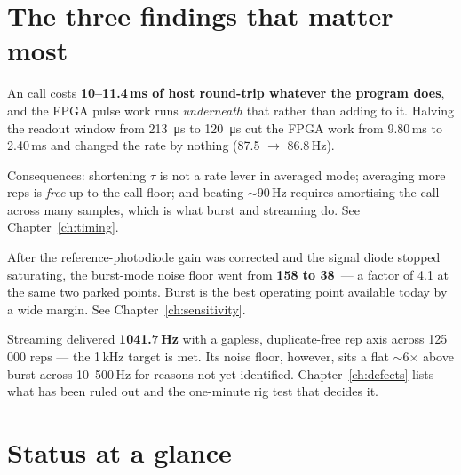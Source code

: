 \section{The three findings that matter most}

\begin{keybox}
An  call costs \textbf{10--11.4\,ms of host round-trip whatever the
program does}, and the FPGA pulse work runs \emph{underneath} that rather than
adding to it. Halving the readout window from \SI{213}{\micro\second} to
\SI{120}{\micro\second} cut the FPGA work from 9.80\,ms to 2.40\,ms and changed
the rate by nothing (87.5 $\rightarrow$ 86.8\,Hz).

Consequences: shortening $\tau$ is not a rate lever in averaged mode; averaging
more reps is \emph{free} up to the call floor; and beating $\sim$90\,Hz requires
amortising the call across many samples, which is what burst and streaming do.
See Chapter~\ref{ch:timing}.
\end{keybox}

\begin{keybox}
After the reference-photodiode gain was corrected and the signal diode stopped
saturating, the burst-mode noise floor went from \textbf{158 to 38\,\etaunit} ---
a factor of 4.1 at the same two parked points. Burst is the best operating point
available today by a wide margin. See Chapter~\ref{ch:sensitivity}.
\end{keybox}

\begin{keybox}
Streaming delivered \textbf{1041.7\,Hz} with a gapless, duplicate-free rep axis
across 125\,000 reps --- the 1\,kHz target is met. Its noise floor, however, sits
a flat $\sim$6$\times$ above burst across 10--500\,Hz for reasons not yet
identified. Chapter~\ref{ch:defects} lists what has been ruled out and the
one-minute rig test that decides it.
\end{keybox}

\section{Status at a glance}

